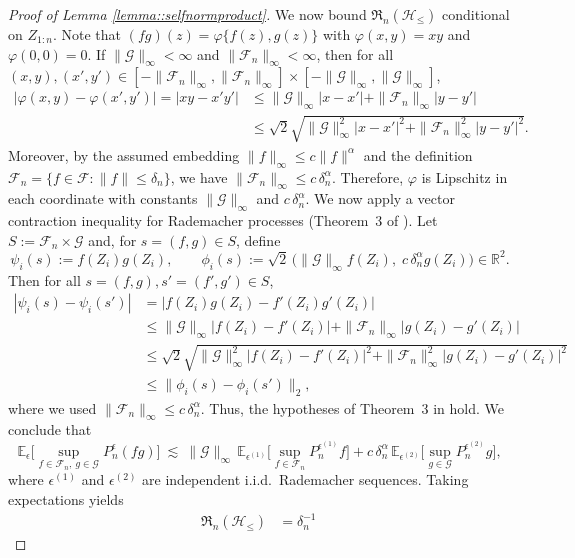 \documentclass[11pt]{article}
\theoremstyle{plain}
\theoremstyle{definition} %
\begin{document}
\begin{proof}[Proof of Lemma \ref{lemma::selfnormproduct}]
We now bound ${\mathfrak R}_n(\mathcal H_{\le})$ conditional on $Z_{1:n}$.
Note that $(fg)(z)=\varphi\{f(z),g(z)\}$ with $\varphi(x,y)=xy$ and $\varphi(0,0)=0$.
If $\|\mathcal G\|_\infty<\infty$ and $\|\mathcal F_n\|_\infty<\infty$, then for all
$(x,y),(x',y')\in [-\|\mathcal F_n\|_\infty,\|\mathcal F_n\|_\infty]\times[-\|\mathcal G\|_\infty,\|\mathcal G\|_\infty]$,
\begin{align*}
|\varphi(x,y)-\varphi(x',y')|
=|xy-x'y'|
&\le
\|\mathcal G\|_\infty |x-x'| + \|\mathcal F_n\|_\infty |y-y'|\\
&\le \sqrt{2}
\sqrt{\|\mathcal G\|_\infty^2 |x-x'|^2 + \|\mathcal F_n\|_\infty^2 |y-y'|^2}.
\end{align*}
Moreover, by the assumed embedding $\|f\|_\infty\le c\|f\|^\alpha$ and the definition
$\mathcal F_n=\{f\in\mathcal F:\|f\|\le \delta_n\}$, we have
$\|\mathcal F_n\|_\infty \le c\,\delta_n^\alpha$.
Therefore, $\varphi$ is Lipschitz in each coordinate with constants
$\|\mathcal G\|_\infty$ and $c\,\delta_n^\alpha$. We now apply a vector contraction inequality for Rademacher processes (Theorem~3 of \citet{maurer2016vector}).
Let $S:=\mathcal F_n\times\mathcal G$ and, for $s=(f,g)\in S$, define
\[
\psi_i(s):=f(Z_i)g(Z_i),
\qquad
\phi_i(s):=\sqrt{2}\,\bigl(\|\mathcal G\|_\infty f(Z_i),\; c\,\delta_n^\alpha g(Z_i)\bigr)\in\mathbb R^2.
\]
Then for all $s=(f,g),s'=(f',g')\in S$,
\begin{align*}
|\psi_i(s)-\psi_i(s')|
&=|f(Z_i)g(Z_i)-f'(Z_i)g'(Z_i)|\\
&\le \|\mathcal G\|_\infty |f(Z_i)-f'(Z_i)| + \|\mathcal F_n\|_\infty |g(Z_i)-g'(Z_i)|\\
&\le \sqrt{2}\sqrt{\|\mathcal G\|_\infty^2|f(Z_i)-f'(Z_i)|^2 + \|\mathcal F_n\|_\infty^2|g(Z_i)-g'(Z_i)|^2}\\
&\le \|\phi_i(s)-\phi_i(s')\|_2,
\end{align*}
where we used $\|\mathcal F_n\|_\infty\le c\,\delta_n^\alpha$.
Thus, the hypotheses of Theorem~3 in \citet{maurer2016vector} hold. We conclude that
\[
\mathbb E_{\epsilon}\Big[\sup_{f\in\mathcal F_n,\ g\in\mathcal G} P_n^\epsilon(fg)\Big]
\ \lesssim\
\|\mathcal G\|_\infty\,\mathbb E_{\epsilon^{(1)}}\Big[\sup_{f\in\mathcal F_n} P_n^{\epsilon^{(1)}} f\Big]
+
c\,\delta_n^\alpha\,\mathbb E_{\epsilon^{(2)}}\Big[\sup_{g\in\mathcal G} P_n^{\epsilon^{(2)}} g\Big],
\]
where $\epsilon^{(1)}$ and $\epsilon^{(2)}$ are independent i.i.d.\ Rademacher sequences. Taking expectations yields
\begin{align*}
\mathfrak R_n(\mathcal H_{\le})
&=
\delta_n^{-1}\,

\end{align*}
\end{proof}
\end{document}
